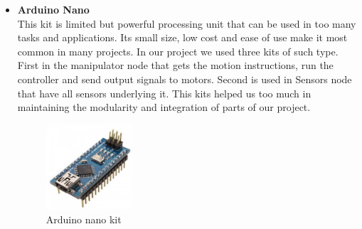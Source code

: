 \documentclass[12pt]{article}
\begin{document}
\begin{itemize}
	\item \textbf{Arduino Nano}\\
	This kit is limited but powerful processing unit that can be used in too many tasks and applications. Its small size, low cost and ease of use make it most common in many projects. In our project we used three kits of such type. First in the manipulator node that gets the motion instructions, run the controller and send output signals to motors. Second is used in Sensors node that have all sensors underlying it. This kits helped us too much in maintaining the modularity and integration of parts of our project.
	
	\begin{figure}[H]
		\centering
		\includegraphics[width =0.3\textwidth]{Fig/Electronics/nano.jpg}
		\caption{Arduino nano kit}
		\label{fig:nano}
	\end{figure}

\end{itemize}
\end{document}
